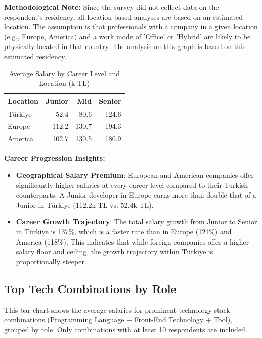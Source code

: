 \documentclass[12pt,a4paper]{article}
\begin{document}
\textbf{Methodological Note:} Since the survey did not collect data on the respondent's residency, all location-based analyses are based on an estimated location. The assumption is that professionals with a company in a given location (e.g., Europe, America) and a work mode of 'Office' or 'Hybrid' are likely to be physically located in that country. The analysis on this graph is based on this estimated residency.

\begin{table}[H]
	\centering
	\small
	\begin{tabular}{lrrr}
		\toprule
		\textbf{Location} & \textbf{Junior} & \textbf{Mid} & \textbf{Senior} \\
		\midrule
		Türkiye          & 52.4            & 80.6         & 124.6           \\
		Europe            & 112.2           & 130.7        & 194.3           \\
		America           & 102.7           & 130.5        & 180.9           \\
		\bottomrule
	\end{tabular}
	\caption{Average Salary by Career Level and Location (k TL)}
\end{table}

\textbf{Career Progression Insights:}
\begin{itemize}
	\item \textbf{Geographical Salary Premium}: European and American companies offer significantly higher salaries at every career level compared to their Turkish counterparts. A Junior developer in Europe earns more than double that of a Junior in Türkiye (112.2k TL vs. 52.4k TL).
	\item \textbf{Career Growth Trajectory}: The total salary growth from Junior to Senior in Türkiye is 137\%, which is a faster rate than in Europe (121\%) and America (118\%). This indicates that while foreign companies offer a higher salary floor and ceiling, the growth trajectory within Türkiye is proportionally steeper.
\end{itemize}

\subsection{Top Tech Combinations by Role}
This bar chart shows the average salaries for prominent technology stack combinations (Programming Language + Front-End Technology + Tool), grouped by role. Only combinations with at least 10 respondents are included.
\end{document}
